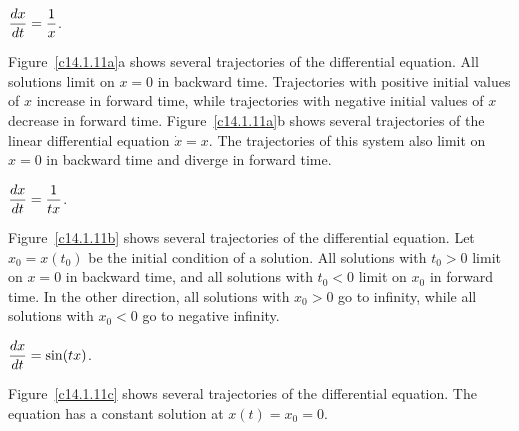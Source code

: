 \documentclass{ximera}
\begin{document}
\begin{computerExercise} \label{c14.1.11a}
$\displaystyle\frac{dx}{dt} = \frac{1}{x}$.

\begin{solution}
Figure~\ref{c14.1.11a}a shows several trajectories of the
differential equation.  All solutions limit on $x = 0$ in backward
time.  Trajectories with positive initial values of $x$ increase in
forward time, while trajectories with negative initial values of $x$
decrease in forward time.  Figure~\ref{c14.1.11a}b shows several trajectories
of the linear differential equation $\dot{x} = x$.  The trajectories of this
system also limit on $x = 0$ in backward time and diverge in forward time.

\begin{figure}[htb]
                       \centerline{%
                       }
\end{figure}

\end{solution}
\end{computerExercise}
\begin{computerExercise} \label{c14.1.11b}
$\displaystyle\frac{dx}{dt} = \frac{1}{tx}$.

\begin{solution}
Figure~\ref{c14.1.11b} shows several trajectories of the
differential equation.  Let $x_0 = x(t_0)$ be the initial condition of
a solution.  All solutions with $t_0 > 0$ limit on $x = 0$ in backward time,
and all solutions with $t_0 < 0$ limit on $x_0$ in forward time.  In the
other direction, all solutions with $x_0 > 0$ go to infinity, while all
solutions with $x_0 < 0$ go to negative infinity.

\begin{figure}[htb]
                       \centerline{%
                       }
\end{figure}

\end{solution}
\end{computerExercise}
\begin{computerExercise} \label{c14.1.11c}
$\displaystyle\frac{dx}{dt} = \sin(tx)$.

\begin{solution}
Figure~\ref{c14.1.11c} shows several trajectories of the
differential equation.  The equation has a constant solution at $x(t)
= x_0 = 0$.

\begin{figure}[htb]
                       \centerline{%
                       }
\end{figure}

\end{solution}
\end{computerExercise}
\end{document}
